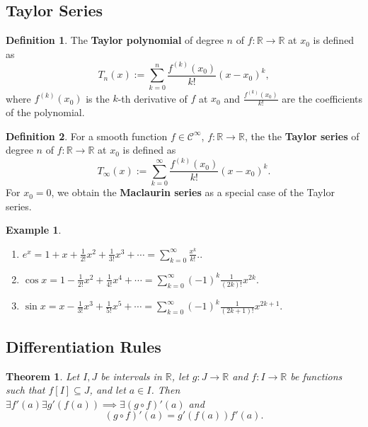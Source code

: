\documentclass[12pt,openany]{book}
\newtheorem{theorem}{Theorem}[chapter]
\theoremstyle{definition}
\newtheorem{definition}{Definition}[chapter]
\newtheorem{example}{Example}[chapter]
\newcommand{\R}{\mathbb{R}}
\begin{document}
\subsection{Taylor Series}
\begin{tcolorbox}[colframe=defcolor,title={\color{white}\bf Taylor Polynomial}]
	\begin{definition}
		The \textbf{Taylor polynomial} of degree $n$ of $f:\R\to\R$ at $x_0$ is defined as \[
		T_n(x):=\sum_{k=0}^n\frac{f^{(k)}(x_0)}{k!}(x-x_0)^k,
		\] where $f^{(k)}(x_0)$ is the $k$-th derivative of $f$ at $x_0$ and $\frac{f^{(k)}(x_0)}{k!}$ are the coefficients of the polynomial.
	\end{definition}
\end{tcolorbox}
\begin{tcolorbox}[colframe=defcolor,title={\color{white}\bf Taylor Series}]
\begin{definition}
	For a smooth function $f\in\mathcal{C}^\infty$, $f:\R\to\R$, the the \textbf{Taylor series} of degree $n$ of $f:\R\to\R$ at $x_0$ is defined as \[
	T_\infty(x):=\sum_{k=0}^\infty\frac{f^{(k)}(x_0)}{k!}(x-x_0)^k.
	\] For $x_0=0$, we obtain the \textbf{Maclaurin series} as a special case of the Taylor series.
\end{definition}
\end{tcolorbox}
\begin{example}
	\ \begin{enumerate}[(1)]
		\item $\displaystyle e^x=1+x+\frac{1}{2!}x^2+\frac{1}{3!}x^3+\cdots=\sum_{k=0}^\infty\frac{x^k}{k!}.
		$.
		\item $\displaystyle \cos x=1-\frac{1}{2!}x^2+\frac{1}{4!}x^4+\cdots=\sum_{k=0}^\infty(-1)^k\frac{1}{(2k)!}x^{2k}.
		$
		\item $\displaystyle \sin x=x-\frac{1}{3!}x^3+\frac{1}{5!}x^5+\cdots=\sum_{k=0}^\infty(-1)^k\frac{1}{(2k+1)!}x^{2k+1}.
		$
	\end{enumerate}
\end{example}

\subsection{Differentiation Rules}
\begin{tcolorbox}[colback=white,colframe=thmcolor,arc=5pt,title={\color{white}\bf Chain Rule}]
	\begin{theorem}
		Let $I,J$ be intervals in $\R$, let $g:J\to\R$ and $f:I\to\R$ be functions such that $f[I]\subseteq J$, and let $a\in I$. Then $
		\exists f'(a)\exists g'(f(a))\implies\exists(g\circ f)'(a)
		$ and $$(g\circ f)'(a)=g'(f(a))f'(a).$$
	\end{theorem}
\end{tcolorbox}
\end{document}
